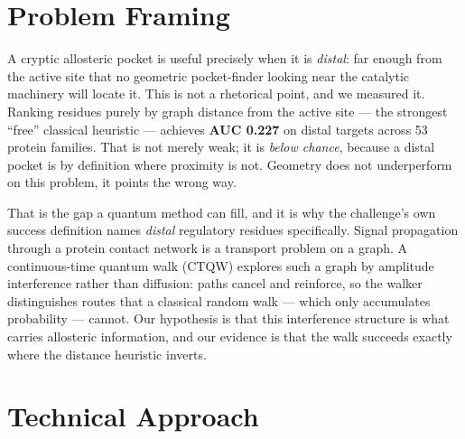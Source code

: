 \documentclass[10pt,a4paper,twocolumn]{article}
\newcommand{\num}[1]{\textbf{#1}}
\begin{document}
\pagestyle{empty}



\section{Problem Framing}

A cryptic allosteric pocket is useful precisely when it is \emph{distal}: far enough from the
active site that no geometric pocket-finder looking near the catalytic machinery will locate it.
This is not a rhetorical point, and we measured it. Ranking residues purely by graph distance from
the active site --- the strongest ``free'' classical heuristic --- achieves \num{AUC 0.227} on
distal targets across 53 protein families. That is not merely weak; it is \emph{below chance},
because a distal pocket is by definition where proximity is not. Geometry does not underperform on
this problem, it points the wrong way.

That is the gap a quantum method can fill, and it is why the challenge's own success definition
names \emph{distal} regulatory residues specifically. Signal propagation through a protein contact
network is a transport problem on a graph. A continuous-time quantum walk (CTQW) explores such a
graph by amplitude interference rather than diffusion: paths cancel and reinforce, so the walker
distinguishes routes that a classical random walk --- which only accumulates probability ---
cannot. Our hypothesis is that this interference structure is what carries allosteric information,
and our evidence is that the walk succeeds exactly where the distance heuristic inverts.

\section{Technical Approach}
\end{document}
